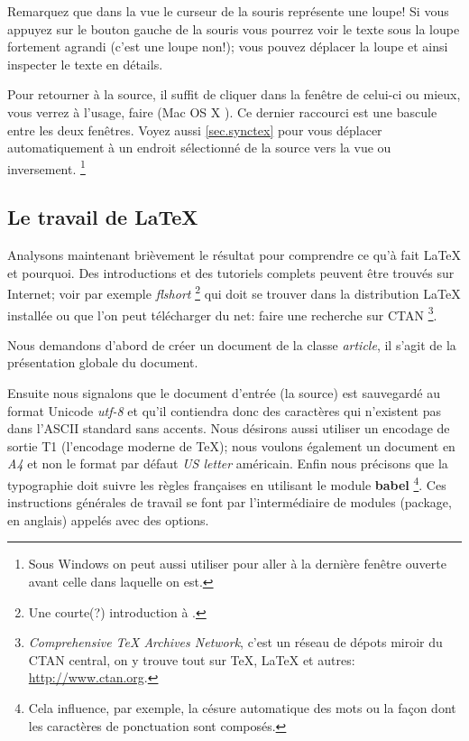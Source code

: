 Remarquez que dans la vue le curseur de la souris représente une loupe! Si vous appuyez sur le bouton gauche de la souris vous pourrez voir le texte sous la loupe fortement agrandi (c'est une loupe non!); vous pouvez déplacer la loupe et ainsi inspecter le texte en détails.

Pour retourner à la source, il suffit de cliquer dans la fenêtre de celui-ci ou mieux, vous verrez à l'usage, faire  (Mac OS X ). Ce dernier raccourci est une bascule entre les deux fenêtres. Voyez aussi \ref{sec.synctex} pour vous déplacer automatiquement à un endroit sélectionné de la source vers la vue ou inversement. \footnote{Sous Windows on peut aussi utiliser  pour aller à la dernière fenêtre ouverte avant celle dans laquelle on est.} 

\subsection{Le travail de \LaTeX}

Analysons maintenant brièvement le résultat pour comprendre ce qu'à fait \LaTeX{} et pourquoi. Des introductions et des tutoriels complets peuvent être trouvés sur Internet; voir par exemple \emph{flshort} \footnote{Une courte(?) introduction à \LaTeXe.} qui doit se trouver dans la distribution \LaTeX{} installée ou que l'on peut télécharger du net: faire une recherche sur CTAN \footnote{\emph{Comprehensive TeX Archives Network}, c'est un réseau de dépots miroir du CTAN central, on y trouve tout sur \TeX{}, \LaTeX{} et autres: \url{http://www.ctan.org}.}.

Nous demandons d'abord de créer un document de la classe \emph{article}, il s'agit de la présentation globale du document. 

Ensuite nous signalons que le document d'entrée (la source) est sauvegardé au format Unicode \emph{utf-8} et qu'il contiendra donc des caractères qui n'existent pas dans l'ASCII standard sans accents. Nous désirons aussi utiliser un encodage de sortie T1 (l'encodage moderne de \TeX); nous voulons également un document en \emph{A4} et non le format par défaut \emph{US letter} américain. Enfin nous précisons que la typographie doit suivre les règles françaises en utilisant le module \textbf{\textsf{babel}} \footnote{ Cela influence, par exemple, la césure automatique des mots ou la façon dont les caractères de ponctuation sont composés.}. Ces instructions générales de travail se font par l'intermédiaire de modules (package, en anglais) appelés avec des options.

